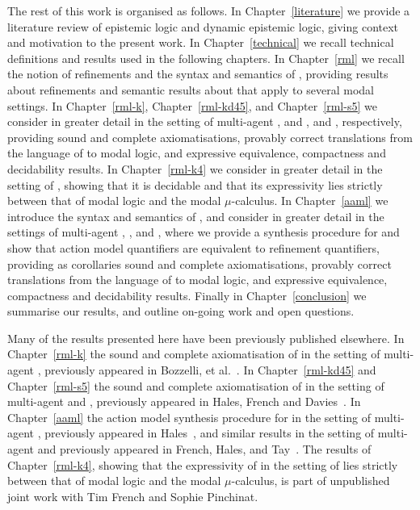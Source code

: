 The rest of this work is organised as follows.
In Chapter~\ref{literature} we provide a literature review of epistemic logic and dynamic epistemic logic, giving context and motivation to the present work.
In Chapter~\ref{technical} we recall technical definitions and results used in the following chapters.
In Chapter~\ref{rml} we recall the notion of refinements and the syntax and semantics of \logicRml{}, providing results about refinements and semantic results about \logicRml{} that apply to several modal settings.
In Chapter~\ref{rml-k}, Chapter~\ref{rml-kd45}, and Chapter~\ref{rml-s5} we consider in greater detail \logicRml{} in the setting of multi-agent \classK{}, \classKFF{} and \classKD{}, and \classS{}, respectively, providing sound and complete axiomatisations, provably correct translations from the language of \logicRml{} to modal logic, and expressive equivalence, compactness and decidability results.
In Chapter~\ref{rml-k4} we consider in greater detail \logicRml{} in the setting of \classKF{}, showing that it is decidable and that its expressivity lies strictly between that of modal logic and the modal $\mu$-calculus.
In Chapter~\ref{aaml} we introduce the syntax and semantics of \logicAaml{}, and consider in greater detail \logicAaml{} in the settings of multi-agent \classK{}, \classKFF{}, and \classS{}, where we provide a synthesis procedure for \logicAaml{} and show that action model quantifiers are equivalent to refinement quantifiers, providing as corollaries sound and complete axiomatisations, provably correct translations from the language of \logicAaml{} to modal logic, and expressive equivalence, compactness and decidability results.
Finally in Chapter~\ref{conclusion} we summarise our results, and outline on-going work and open questions.

Many of the results presented here have been previously published elsewhere.
In Chapter~\ref{rml-k} the sound and complete axiomatisation of \logicRml{} in the setting of multi-agent \classK{}, previously appeared in Bozzelli, et al.~\cite{bozzelli:2014b}.
In Chapter~\ref{rml-kd45} and Chapter~\ref{rml-s5} the sound and complete axiomatisation of \logicRml{} in the setting of multi-agent \classKD{} and \classS{}, previously appeared in Hales, French and Davies~\cite{hales:2012}.
In Chapter~\ref{aaml} the action model synthesis procedure for \logicAaml{} in the setting of multi-agent \classK{}, previously appeared in Hales~\cite{hales:2013}, and similar results in the setting of multi-agent \classKFF{} and \classS{} previously appeared in French, Hales, and Tay~\cite{hales:2014}.
The results of Chapter~\ref{rml-k4}, showing that the expressivity of \logicRml{} in the setting of \classKF{} lies strictly between that of modal logic and the modal $\mu$-calculus, is part of unpublished joint work with Tim French and Sophie Pinchinat.
